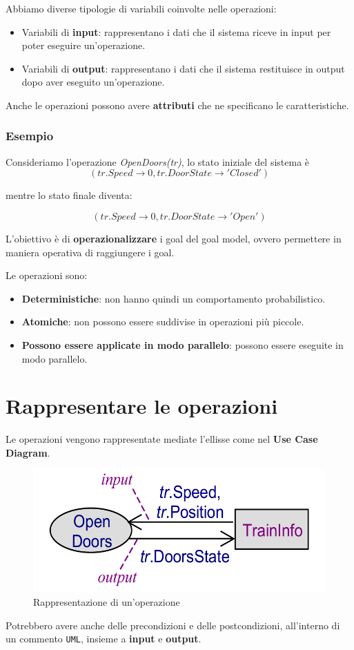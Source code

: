 Abbiamo diverse tipologie di variabili coinvolte nelle operazioni:
\begin{itemize}
    \item Variabili di \textbf{input}: rappresentano i dati che il sistema riceve in
    input per poter eseguire un'operazione.
    \item Variabili di \textbf{output}: rappresentano i dati che il sistema restituisce
    in output dopo aver eseguito un'operazione.
\end{itemize}

Anche le operazioni possono avere \textbf{attributi} che ne specificano le
caratteristiche.

\subsubsection{Esempio}
Consideriamo l'operazione \textit{OpenDoors(tr)}, lo stato iniziale del 
sistema è 
\[(tr.Speed \rightarrow 0, tr.DoorState \rightarrow 'Closed')\]

mentre lo stato finale diventa:

\[(tr.Speed \rightarrow 0, tr.DoorState \rightarrow 'Open')\]

\begin{tcolorbox}
    L'obiettivo è di \textbf{operazionalizzare} i goal del goal model, ovvero
    permettere in maniera operativa di raggiungere i goal.
\end{tcolorbox}

Le operazioni sono:
\begin{itemize}
    \item \textbf{Deterministiche}: non hanno quindi un comportamento
    probabilistico.
    \item \textbf{Atomiche}: non possono essere suddivise in operazioni più
    piccole. 
    \item \textbf{Possono essere applicate in modo parallelo}: possono essere
    eseguite in modo parallelo.
\end{itemize}

\section{Rappresentare le operazioni}
Le operazioni vengono rappresentate mediate l'ellisse come nel \textbf{Use Case Diagram}.

\begin{figure}[H]
    \centering
    \includegraphics[scale = 0.3]{img/operation.png}
    \caption{Rappresentazione di un'operazione}
\end{figure}
Potrebbero avere anche delle precondizioni e delle postcondizioni, all'interno di un 
commento \texttt{UML}, insieme a \textbf{input} e \textbf{output}.
